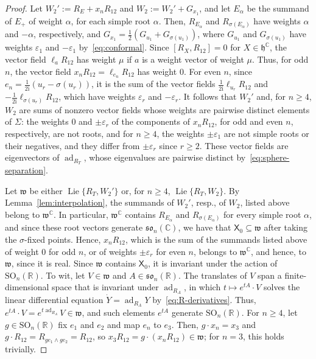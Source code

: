 \documentclass{article}
\newcommand{\R}{\mathbb{R}}
\newcommand{\C}{\mathbb{C}}
\newcommand{\frakh}{\mathfrak{h}}
\newcommand{\frakw}{\mathfrak{w}}
\newcommand{\sX}{\mathsf{X}}
\theoremstyle{definition}
\theoremstyle{plain}
\begin{document}
\begin{proof}
Let $W_2':=R_E+x_nR_{12}$ and $W_2:=W_2'+G_{x_1}$, and let $E_\alpha$ be the summand of $E_+$ of weight $\alpha$, for each simple root $\alpha$.
Then, $R_{E_\alpha}$ and $R_{\sigma(E_\alpha)}$ have weights $\alpha$ and $-\alpha$, respectively, and $G_{x_1}=\frac12(G_{u_1}+G_{\sigma(u_1)})$, where $G_{u_1}$ and $G_{\sigma(u_1)}$ have weights $\varepsilon_1$ and $-\varepsilon_1$ by~\eqref{eq:conformal}.
Since $[R_X,R_{12}]=0$ for $X\in\frakh^\C$, the vector field $\ell_aR_{12}$ has weight $\mu$ if $a$ is a weight vector of weight $\mu$.
Thus, for odd $n$, the vector field $x_nR_{12}=\ell_{e_n}R_{12}$ has weight $0$.
For even $n$, since $e_n=\frac{1}{2\mathrm{i}}(u_r-\sigma(u_r))$, it is the sum of the vector fields $\frac{1}{2\mathrm{i}}\ell_{u_r}R_{12}$ and $-\frac{1}{2\mathrm{i}}\ell_{\sigma(u_r)}R_{12}$, which have weights $\varepsilon_r$ and $-\varepsilon_r$.
It follows that $W_2'$ and, for $n\geq4$, $W_2$ are sums of nonzero vector fields whose weights are pairwise distinct elements of $\Sigma$: the weights $0$ and $\pm\varepsilon_r$ of the components of $x_nR_{12}$,
  for odd and even $n$, respectively, are not roots, and for $n\geq4$, the weights $\pm\varepsilon_1$ are not simple roots or their negatives, and they differ from $\pm\varepsilon_r$ since $r\geq2$.
These vector fields are eigenvectors of $\operatorname{ad}_{R_T}$, whose eigenvalues are pairwise distinct by~\eqref{eq:sphere-separation}.

Let $\frakw$ be either $\operatorname{Lie}\{R_T,W_2'\}$ or, for $n\geq4$, $\operatorname{Lie}\{R_T,W_2\}$.
By Lemma~\ref{lem:interpolation}, the summands of $W_2'$, resp., of $W_2$, listed above belong to $\frakw^\C$.
In particular, $\frakw^\C$ contains $R_{E_\alpha}$ and $R_{\sigma(E_\alpha)}$ for every simple root $\alpha$, and since these root vectors generate $\mathfrak{so}_n(\C)$, we have that $\sX_0\subseteq\frakw$ after taking the $\sigma$-fixed points.
Hence, $x_nR_{12}$, which is the sum of the summands listed above of weight $0$ for odd $n$, or of weights $\pm\varepsilon_r$ for even $n$, belongs to $\frakw^\C$, and hence, to $\frakw$, since it is real.
Since $\frakw$ contains $\sX_0$, it is invariant under the action of $\mathrm{SO}_n(\R)$.
To wit, let $V\in\frakw$ and $A\in\mathfrak{so}_n(\R)$. The translates of $V$ span a finite-dimensional space that is invariant under $\operatorname{ad}_{R_A}$, in which $t\mapsto e^{tA}\cdot V$ solves the linear differential equation $\dot Y=\operatorname{ad}_{R_A}Y$ by~\eqref{eq:R-derivatives}. Thus, $e^{tA}\cdot V=e^{t\operatorname{ad}_{R_A}}V\in\frakw$, and such elements $e^{tA}$ generate $\mathrm{SO}_n(\R)$.
For $n\geq4$, let $g\in\mathrm{SO}_n(\R)$ fix $e_1$ and $e_2$ and map $e_n$ to $e_3$. Then,
  $g\cdot x_n=x_3$ and $g\cdot R_{12}=R_{ge_1\wedge ge_2}=R_{12}$, so $x_3R_{12}=g\cdot(x_nR_{12})\in\frakw$; for $n=3$, this holds trivially.


\end{proof}
\end{document}
